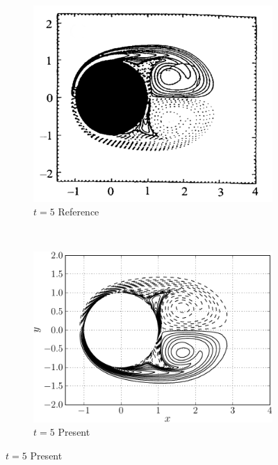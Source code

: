 \begin{figure}[p]
     
     \begin{subfigure}[t]{0.45\textwidth}
             \includegraphics[height=0.2\textheight]{figures/eulerian/ISC_vorticityContours_t5_ref-mod.png}
             \caption{$t=5$ Reference}
             \label{fig:ISC_vorticityContours_t5_ref}
     \end{subfigure}%
     ~ %
     \begin{subfigure}[t]{0.45\textwidth}
             \includegraphics[height=0.2\textheight]{figures/eulerian/ISC_vorticityContours_t5-crop.pdf}
             \caption{$t=5$ Present}
             \label{fig:ISC_vorticityContours_t5-crop}
     \end{subfigure}
     

\end{figure}
